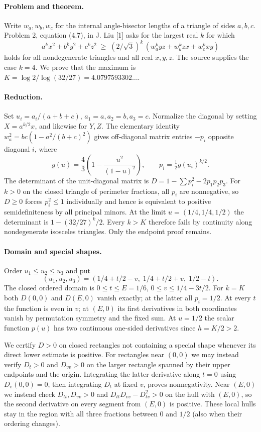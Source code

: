 \documentclass[11pt,a4paper]{article}
\numberwithin{equation}{section}
\theoremstyle{definition}
\theoremstyle{remark}
\begin{document}
\paragraph{Problem and theorem.}
Write $w_a,w_b,w_c$ for the internal angle-bisector lengths of a triangle of sides $a,b,c$. Problem 2, equation (4.7), in J. Liu [1] asks for the largest real $k$ for which
\[
 a^kx^2+b^ky^2+c^kz^2\;\ge\;
 (2/\sqrt3)^k\,(w_a^kyz+w_b^kzx+w_c^kxy)
\]
holds for all nondegenerate triangles and all real $x,y,z$. The source supplies the case $k=4$. We prove that the maximum is $K=\log 2/\log(32/27)=4.0797593302\ldots$.

\paragraph{Reduction.}
Set $u_i=a_i/(a+b+c)$, $a_1=a,a_2=b,a_3=c$. Normalize the diagonal by setting $X=a^{k/2}x$, and likewise for $Y,Z$. The elementary identity $w_a^2=bc(1-a^2/(b+c)^2)$ gives off-diagonal matrix entries $-p_i$ opposite diagonal $i$, where
\[
 g(u)=\frac43\left(1-\frac{u^2}{(1-u)^2}\right),
 \qquad p_i=\tfrac12g(u_i)^{k/2}.
\]
The determinant of the unit-diagonal matrix is
$D=1-\sum p_i^2-2p_1p_2p_3$. For $k>0$ on the closed triangle of perimeter fractions, all $p_i$ are nonnegative, so $D\ge0$ forces $p_i^2\le1$ individually and hence is equivalent to positive semidefiniteness by all principal minors. At the limit $u=(1/4,1/4,1/2)$ the determinant is $1-(32/27)^k/2$. Every $k>K$ therefore fails by continuity along nondegenerate isosceles triangles. Only the endpoint proof remains.

\paragraph{Domain and special shapes.}
Order $u_1\le u_2\le u_3$ and put
\[
 (u_1,u_2,u_3)=(1/4+t/2-v,\;1/4+t/2+v,\;1/2-t).
\]
The closed ordered domain is $0\le t\le E=1/6$, $0\le v\le1/4-3t/2$. For $k=K$ both $D(0,0)$ and $D(E,0)$ vanish exactly; at the latter all $p_i=1/2$. At every $t$ the function is even in $v$; at $(E,0)$ its first derivatives in both coordinates vanish by permutation symmetry and the fixed sum. At $u=1/2$ the scalar function $p(u)$ has two continuous one-sided derivatives since $h=K/2>2$.

We certify $D>0$ on closed rectangles not containing a special shape whenever its direct lower estimate is positive. For rectangles near $(0,0)$ we may instead verify $D_t>0$ and $D_{vv}>0$ on the larger rectangle spanned by their upper endpoints and the origin. Integrating the latter derivative along $t=0$ using $D_v(0,0)=0$, then integrating $D_t$ at fixed $v$, proves nonnegativity. Near $(E,0)$ we instead check $D_{tt},D_{vv}>0$ and $D_{tt}D_{vv}-D_{tv}^2>0$ on the hull with $(E,0)$, so the second derivative on every segment from $(E,0)$ is positive. These local hulls stay in the region with all three fractions between $0$ and $1/2$ (also when their ordering changes).
\end{document}
